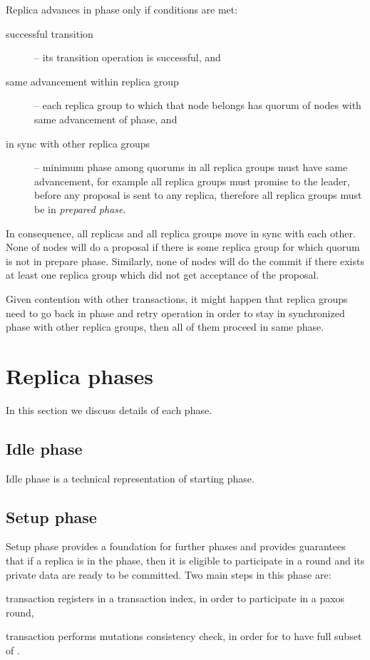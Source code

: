 Replica advances in phase only if conditions are met: \begin{description}
\item[successful transition] -- its transition operation is successful, and
\item[same advancement within replica group] -- each replica group to which that node belongs has quorum of nodes with same advancement of phase, and
\item[in sync with other replica groups] -- minimum phase among quorums in all replica groups must have same advancement, for example all replica groups must promise to the leader, before any proposal is sent to any replica, therefore all replica groups must be in \emph{prepared phase}.
\end{description}


In consequence, all replicas and all replica groups move in sync with each other. None of nodes will do a proposal if there is some replica group for which quorum is not in prepare phase. 
Similarly, none of nodes will do the commit if there exists at least one replica group which did not get acceptance of the proposal.  

Given contention with other transactions, it might happen that replica groups need to go back in phase and retry operation in order to stay in synchronized phase with other replica groups, then all of them proceed in same phase.

\section{Replica phases}
In this section we discuss details of each phase.

\subsection{Idle phase}
Idle phase is a technical representation of starting phase.

\subsection{Setup phase}
Setup phase provides a foundation for further phases and provides guarantees that if a replica is in the phase, then it is eligible to participate in a \paxos round and its private data are ready to be committed. Two main steps in this phase are: \begin{enumerate*}
\item transaction registers in a transaction index, in order to participate in a paxos round,
\item transaction performs mutations consistency check, in order for  to have full subset of \mutations.
\end{enumerate*}


